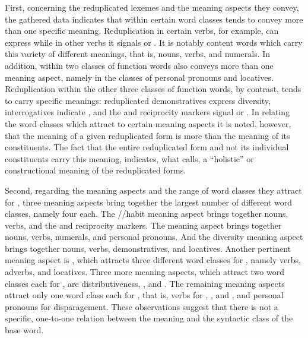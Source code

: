 {First, concerning the reduplicated lexemes and the meaning aspects they convey, the gathered data indicates that within certain word classes  tends to convey more than one specific meaning. Reduplication in certain verbs, for example, can express  while in other verbs it signals  or . It is notably content words which carry this variety of different meanings, that is, nouns, verbs, and numerals. In addition,  within two classes of function words also conveys more than one meaning aspect, namely in the classes of personal pronouns and locatives. Reduplication within the other three classes of function words, by contrast, tends to carry specific meanings: reduplicated demonstratives express diversity, interrogatives indicate , and the  and reciprocity markers signal  or . In relating the word classes which attract  to certain meaning aspects it is noted, however, that the meaning of a given reduplicated form is more than the meaning of its constituents. The fact that the entire reduplicated form and not its individual constituents carry this meaning, indicates, what \citet[260–261]{Booij.2013} calls, a “holistic” or constructional meaning of the reduplicated forms.



Second, regarding the meaning aspects and the range of word classes they attract for , three meaning aspects bring together the largest number of different word classes, namely four each. The //habit meaning aspect brings together nouns, verbs, and the  and reciprocity markers. The  meaning aspect brings together nouns, verbs, numerals, and personal pronouns. And the diversity meaning aspect brings together nouns, verbs, demonstratives, and locatives. Another pertinent meaning aspect is , which attracts three different word classes for , namely verbs, adverbs, and locatives. Three more meaning aspects, which attract two word classes each for , are distributiveness, , and . The remaining meaning aspects attract only one word class each for , that is, verbs for , , and , and personal pronouns for disparagement. These observations suggest that there is not a specific, one-to-one relation between the meaning and the syntactic class of the base word.


}

